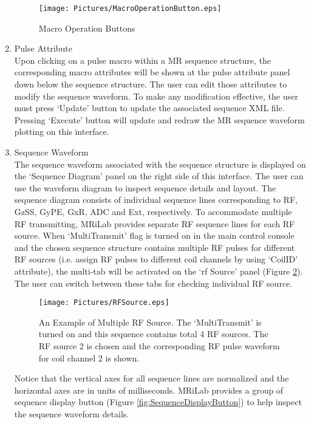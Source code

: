 \documentclass{book}%
\begin{document}
\begin{enumerate}
\begin{figure}[htbp]
	\centering
		\texttt{[image: Pictures/MacroOperationButton.eps]}
	\caption{Macro Operation Buttons}
	\label{fig:MacroOperationButton}
\end{figure}

	\item Pulse Attribute \\
	
Upon clicking on a pulse macro within a MR sequence structure, the corresponding macro attributes will be shown at the pulse attribute panel down below the sequence structure. The user can edit those attributes to modify the sequence waveform. To make any modification effective, the user must press `Update' button to update the associated sequence XML file. Pressing `Execute' button will update and redraw the MR sequence waveform plotting on this interface.
	
	\item Sequence Waveform \\
	
The sequence waveform associated with the sequence structure is displayed on the `Sequence Diagram' panel on the right side of this interface. The user can use the waveform diagram to inspect sequence details and layout. The sequence diagram consists of individual sequence lines corresponding to RF, GzSS, GyPE, GxR, ADC and Ext, respectively. To accommodate multiple RF transmitting, MRiLab provides separate RF sequence lines for each RF source. When `MultiTransmit' flag is turned on in the main control console and the chosen sequence structure contains multiple RF pulses for different RF sources (i.e. assign RF pulses to different coil channels by using `CoilID' attribute), the multi-tab will be activated on the `rf Source' panel (Figure \ref{fig:RFSource}). The user can switch between these tabs for checking individual RF source.

\begin{figure}[htbp]
	\centering
		\texttt{[image: Pictures/RFSource.eps]}
	\caption{An Example of Multiple RF Source. The `MultiTransmit' is turned on and this sequence contains total 4 RF sources. The RF source 2 is chosen and the corresponding RF pulse waveform for coil channel 2 is shown.}
	\label{fig:RFSource}
\end{figure}

Notice that the vertical axes for all sequence lines are normalized and the horizontal axes are in units of milliseconds. MRiLab provides a group of sequence display button (Figure \ref{fig:SequenceDisplayButton}) to help inspect the sequence waveform details.


\end{enumerate}
\end{document}
